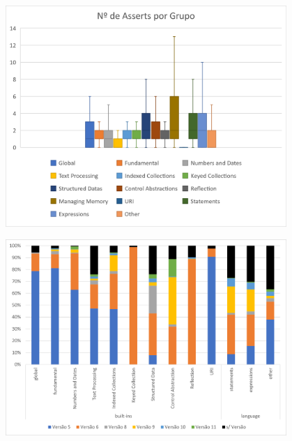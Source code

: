 \documentclass[runningheads]{llncs}
\begin{document}
\begin{figure}
\centering
\begin{minipage}{.5\textwidth}
  \centering
  \includegraphics[width=0.95\textwidth]{images/n_asserts.png}
  \label{fig:grafico_bigodes}
\end{minipage}%
\begin{minipage}{.5\textwidth}
  \centering
  \includegraphics[width=0.95\textwidth]{images/version.png}
  \label{fig:grafico_stackBar}
\end{minipage}
\end{figure}


\end{document}
